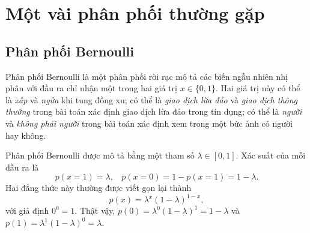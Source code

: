 

\section{Một vài phân phối thường gặp}
\subsection{Phân phối Bernoulli}

Phân phối Bernoulli là một phân phối rời rạc mô tả các biến ngẫu nhiên nhị
phân với đầu ra chỉ nhận một trong hai giá trị $x \in \{0, 1\}$. Hai giá trị
này có thể là \textit{xấp} và \textit{ngửa} khi tung đồng xu; có thể là
\textit{giao dịch lừa đảo} và \textit{giao dịch thông thường} trong bài toán
xác
định giao dịch lừa đảo trong tín dụng; có thể là \textit{người} và \textit{không
phải người} trong bài toán xác định xem trong một bức ảnh có người hay không.

Phân phối Bernoulli được mô tả bằng một tham số $\lambda \in [0, 1]$. Xác suất của mỗi đầu ra là
\begin{equation}
\label{eqn:30_29}
p(x = 1) = \lambda, ~~~~ p(x = 0) = 1 - p(x = 1) = 1 - \lambda.
\end{equation}
Hai đẳng thức này thường được viết gọn lại thành
\begin{equation}
\label{eqn:30_292}
p(x) = \lambda^x (1 - \lambda)^{1 - x},
\end{equation}
với giả định $0 ^0 = 1$. Thật vậy, $p(0) = \lambda^0 (1 - \lambda)^1 = 1 -
\lambda$ và $p(1) = \lambda^1 (1 - \lambda)^0 = \lambda$.


